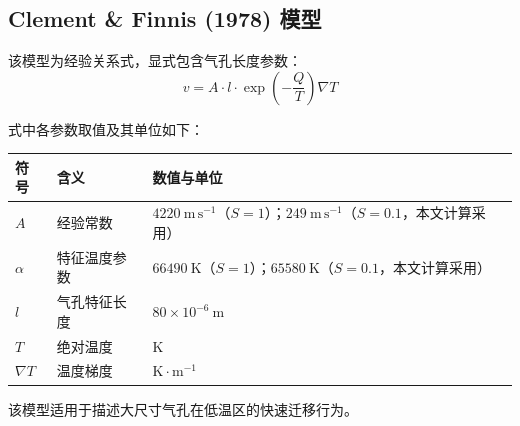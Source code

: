 \subsection{Clement \& Finnis (1978) 模型}

该模型为经验关系式，显式包含气孔长度参数：
\begin{equation}
v = A \cdot l \cdot \exp\left(-\frac{Q}{T}\right) \nabla T
\label{eq:app_b_clement_finnis_migration_velocity}
\end{equation}

式中各参数取值及其单位如下：
\begin{center}
	\begin{tabularx}{\textwidth}{>{\centering\arraybackslash\hsize=0.8\hsize}X 
			>{\RaggedRight\arraybackslash\hsize=1.0\hsize}X 
			>{\RaggedRight\arraybackslash\hsize=1.2\hsize}X}
		\toprule
		符号 & 含义 & 数值与单位 \\
		\midrule
		$A$ 
		& 经验常数 
		& $4220~\mathrm{m\,s^{-1}}$（$S=1$）；$249~\mathrm{m\,s^{-1}}$（$S=0.1$，本文计算采用） \\
		
		$\alpha$ 
		& 特征温度参数 
		& $66490~\mathrm{K}$（$S=1$）；$65580~\mathrm{K}$（$S=0.1$，本文计算采用） \\
		
		$l$ 
		& 气孔特征长度 
		& $80 \times 10^{-6}\ \mathrm{m}$ \\
		
		$T$ 
		& 绝对温度 
		& $\mathrm{K}$ \\
		
		$\nabla T$ 
		& 温度梯度 
		& $\mathrm{K\cdot m^{-1}}$ \\
		\bottomrule
	\end{tabularx}
\end{center}

该模型适用于描述大尺寸气孔在低温区的快速迁移行为。
